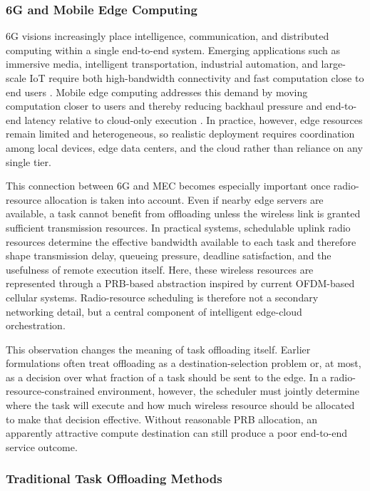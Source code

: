 \subsubsection{6G and Mobile Edge Computing}

6G visions increasingly place intelligence, communication, and distributed computing within a single end-to-end system. Emerging applications such as immersive media, intelligent transportation, industrial automation, and large-scale IoT require both high-bandwidth connectivity and fast computation close to end users \cite{saad2020vision}. Mobile edge computing addresses this demand by moving computation closer to users and thereby reducing backhaul pressure and end-to-end latency relative to cloud-only execution \cite{satyanarayanan2017emergence, mao2017survey}. In practice, however, edge resources remain limited and heterogeneous, so realistic deployment requires coordination among local devices, edge data centers, and the cloud rather than reliance on any single tier.

This connection between 6G and MEC becomes especially important once radio-resource allocation is taken into account. Even if nearby edge servers are available, a task cannot benefit from offloading unless the wireless link is granted sufficient transmission resources. In practical systems, schedulable uplink radio resources determine the effective bandwidth available to each task and therefore shape transmission delay, queueing pressure, deadline satisfaction, and the usefulness of remote execution itself. Here, these wireless resources are represented through a PRB-based abstraction inspired by current OFDM-based cellular systems. Radio-resource scheduling is therefore not a secondary networking detail, but a central component of intelligent edge-cloud orchestration.

This observation changes the meaning of task offloading itself. Earlier formulations often treat offloading as a destination-selection problem or, at most, as a decision over what fraction of a task should be sent to the edge. In a radio-resource-constrained environment, however, the scheduler must jointly determine where the task will execute and how much wireless resource should be allocated to make that decision effective. Without reasonable PRB allocation, an apparently attractive compute destination can still produce a poor end-to-end service outcome.

\subsubsection{Traditional Task Offloading Methods}

